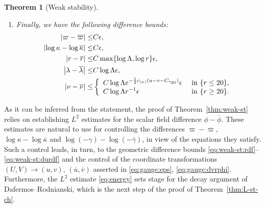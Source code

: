 \documentclass[10pt, reqno]{amsart}
\newtheorem{theorem}{Theorem}[section]
\theoremstyle{definition}
\theoremstyle{remark}
\theoremstyle{conjecture}
\numberwithin{equation}{section}
\newcommand{\set}[1]{\{#1\}}
\newcommand{\0}{\emptyset}
\newcommand{\gmm}{\gamma}
\newcommand{\eps}{\epsilon}
\newcommand{\kpp}{\kappa}
\newcommand{\lmb}{\lambda}
\newcommand{\Lmb}{\Lambda}
\newcommand{\calH}{\mathcal H}
\newcommand{\calI}{\mathcal I}
\newcommand{\dur}{\nu}
\newcommand{\dvr}{\lmb}
\newcommand{\EH}{\calH^{+}}
\newcommand{\NI}{\calI^{+}}						%
\newcommand{\ubg}{\overline{u}}					%
\newcommand{\vbg}{\overline{v}}					%
\newcommand{\phibg}{\overline{\phi}}				%
\newcommand{\dvrbg}{\overline{\dvr}}				%
\newcommand{\durbg}{\overline{\dur}}				%
\newcommand{\rbg}{\overline{r}}					%
\newcommand{\varpibg}{\overline{\varpi}}				%
\newcommand{\kppbg}{\overline{\kpp}}					%
\newcommand{\gmmbg}{\overline{\gmm}}					%
\newcommand{\Abs}[1]{\left\vert #1 \right\vert}
\begin{document}
\begin{theorem} [Weak stability]
\begin{enumerate}
\item Finally, we have the following difference bounds:
\begin{align}
	\Abs{\varpi - \varpibg} \leq & C \eps, \label{eq:weak-st:mdf} \\
	\Abs{\log \kpp - \log \kppbg} \leq & C \eps, 		\label{eq:weak-st:kppdf} \\
	\Abs{r - \rbg} \leq & C \max\set{\log \Lmb, \log r} \eps, \label{eq:weak-st:rdf} \\
	\Abs{\dvr - \dvrbg} \leq & C \log \Lmb \eps, 		\label{eq:weak-st:dvrdf} \\
	\Abs{\dur - \durbg} \leq & \left\{
	\begin{array}{ll}
	\displaystyle{C \log \Lmb e^{- \frac{1}{2} c_{(\dur)} (u - v - C_{\gmm_{20}})}} \eps & \hbox{ in } \set{r \leq 20}, \\
	\displaystyle{C \log \Lmb r^{-1}\eps}  & \hbox{ in } \set{r \geq 20}.
	\end{array} \right. 					\label{eq:weak-st:durdf} 
\end{align}
\end{enumerate}
\end{theorem}

As it can be inferred from the statement, the proof of Theorem~\ref{thm:weak-st} relies on establishing $L^{2}$ estimates for the scalar field difference $\phi - \phibg$. These estimates are natural to use for controlling the differences $\varpi - \varpibg$, $\log \kpp - \log \kppbg$ and $\log (-\gmm) - \log (-\gmmbg)$, in view of the equations they satisfy. Such a control leads, in turn, to the geometric difference bounds \eqref{eq:weak-st:rdf}--\eqref{eq:weak-st:durdf} and the control of the coordinate transformations $(U, V) \to (u, v), \, (\ubg, \vbg)$ asserted in \eqref{eq:gauge:eps}, \eqref{eq:gauge:dvrphi}. Furthermore, the $L^{2}$ estimate \eqref{eq:energy} sets stage for the decay argument of Dafermos--Rodnianski, which is the next step of the proof of Theorem~\ref{thm:L-st-ch}.
\end{document}

